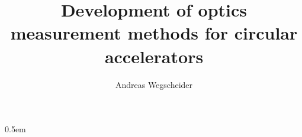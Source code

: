 \documentclass[titlepage]{scrbook}
\author{Andreas Wegscheider}
\title{Development of optics measurement methods for circular accelerators}
\begin{document}
%




\parindent0pt
\parskip0.5em

%












    
\end{document}
